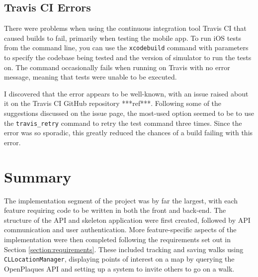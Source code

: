 \subsection{Travis CI Errors}

There were problems when using the continuous integration tool Travis CI that caused builds to fail, primarily when testing the mobile app. To run iOS tests from the command line, you can use the \verb|xcodebuild| command with parameters to specify the codebase being tested and the version of simulator to run the tests on. The command occasionally fails when running on Travis with no error message, meaning that tests were unable to be executed.

I discovered that the error appears to be well-known, with an issue raised about it on the Travis CI GitHub repository ***ref***. Following some of the suggestions discussed on the issue page, the most-used option seemed to be to use the \verb|travis_retry| command to retry the test command three times. Since the error was so sporadic, this greatly reduced the chances of a build failing with this error.



\section{Summary}

The implementation segment of the project was by far the largest, with each feature requiring code to be written in both the front and back-end. The structure of the API and skeleton application were first created, followed by API communication and user authentication. More feature-specific aspects of the implementation were then completed following the requirements set out in Section \ref{section:requirements}. These included tracking and saving walks using \verb|CLLocationManager|, displaying points of interest on a map by querying the OpenPlaques API and setting up a system to invite others to go on a walk.





